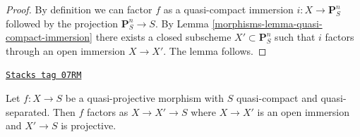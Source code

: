 \begin{proof}

By definition we can factor $f$ as a quasi-compact immersion
$i : X \to \mathbf{P}^n_S$ followed by the projection $\mathbf{P}^n_S \to S$.
By Lemma \ref{morphisms-lemma-quasi-compact-immersion} there exists a closed
subscheme $X' \subset \mathbf{P}^n_S$ such that $i$ factors through
an open immersion $X \to X'$. The lemma follows.
\end{proof}

\begin{lemma}
\label{morphisms-lemma-quasi-projective-open-projective}
\href{https://stacks.math.columbia.edu/tag/07RM}{\texttt{Stacks tag 07RM}}

Let $f : X \to S$ be a quasi-projective morphism with $S$ quasi-compact
and quasi-separated. Then $f$ factors as $X \to X' \to S$ where $X \to X'$
is an open immersion and $X' \to S$ is projective.
\end{lemma}

